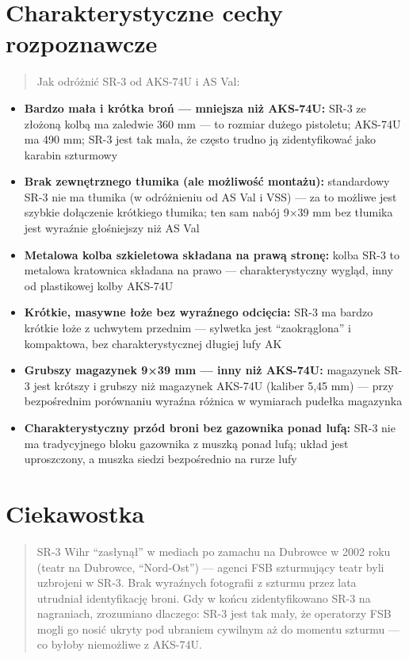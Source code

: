 \documentclass[12pt,openany,oneside]{book}
\providecommand{\tightlist}{%
  \setlength{\itemsep}{0pt}\setlength{\parskip}{0pt}}
\begin{document}
\section{Charakterystyczne cechy
rozpoznawcze}\label{charakterystyczne-cechy-rozpoznawcze-52}

\begin{quote}
Jak odróżnić SR-3 od AKS-74U i AS Val:
\end{quote}

\begin{itemize}
\tightlist
\item
  \textbf{Bardzo mała i krótka broń --- mniejsza niż AKS-74U:} SR-3 ze
  złożoną kolbą ma zaledwie 360 mm --- to rozmiar dużego pistoletu;
  AKS-74U ma 490 mm; SR-3 jest tak mała, że często trudno ją
  zidentyfikować jako karabin szturmowy
\item
  \textbf{Brak zewnętrznego tłumika (ale możliwość montażu):}
  standardowy SR-3 nie ma tłumika (w odróżnieniu od AS Val i VSS) --- za
  to możliwe jest szybkie dołączenie krótkiego tłumika; ten sam nabój
  9×39 mm bez tłumika jest wyraźnie głośniejszy niż AS Val
\item
  \textbf{Metalowa kolba szkieletowa składana na prawą stronę:} kolba
  SR-3 to metalowa kratownica składana na prawo --- charakterystyczny
  wygląd, inny od plastikowej kolby AKS-74U
\item
  \textbf{Krótkie, masywne łoże bez wyraźnego odcięcia:} SR-3 ma bardzo
  krótkie łoże z uchwytem przednim --- sylwetka jest ``zaokrąglona'' i
  kompaktowa, bez charakterystycznej długiej lufy AK
\item
  \textbf{Grubszy magazynek 9×39 mm --- inny niż AKS-74U:} magazynek
  SR-3 jest krótszy i grubszy niż magazynek AKS-74U (kaliber 5,45 mm)
  --- przy bezpośrednim porównaniu wyraźna różnica w wymiarach pudełka
  magazynka
\item
  \textbf{Charakterystyczny przód broni bez gazownika ponad lufą:} SR-3
  nie ma tradycyjnego bloku gazownika z muszką ponad lufą; układ jest
  uproszczony, a muszka siedzi bezpośrednio na rurze lufy
\end{itemize}

\section{Ciekawostka}\label{ciekawostka-52}

\begin{quote}
SR-3 Wihr ``zasłynął'' w mediach po zamachu na Dubrowce w 2002 roku
(teatr na Dubrowce, ``Nord-Ost'') --- agenci FSB szturmujący teatr byli
uzbrojeni w SR-3. Brak wyraźnych fotografii z szturmu przez lata
utrudniał identyfikację broni. Gdy w końcu zidentyfikowano SR-3 na
nagraniach, zrozumiano dlaczego: SR-3 jest tak mały, że operatorzy FSB
mogli go nosić ukryty pod ubraniem cywilnym aż do momentu szturmu --- co
byłoby niemożliwe z AKS-74U.
\end{quote}
\end{document}
